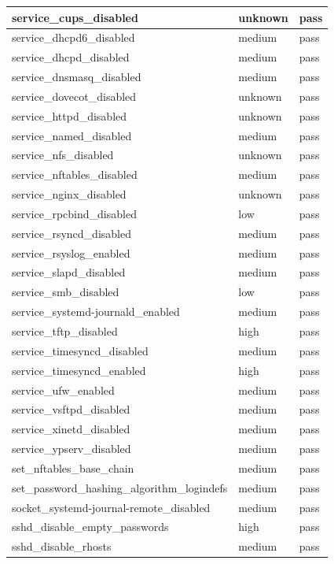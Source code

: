\begin{longtable}{|p{10cm}|p{2cm}|p{2cm}|}
\hline
service\_cups\_disabled & unknown & pass \\
\hline
service\_dhcpd6\_disabled & medium & pass \\
\hline
service\_dhcpd\_disabled & medium & pass \\
\hline
service\_dnsmasq\_disabled & medium & pass \\
\hline
service\_dovecot\_disabled & unknown & pass \\
\hline
service\_httpd\_disabled & unknown & pass \\
\hline
service\_named\_disabled & medium & pass \\
\hline
service\_nfs\_disabled & unknown & pass \\
\hline
service\_nftables\_disabled & medium & pass \\
\hline
service\_nginx\_disabled & unknown & pass \\
\hline
service\_rpcbind\_disabled & low & pass \\
\hline
service\_rsyncd\_disabled & medium & pass \\
\hline
service\_rsyslog\_enabled & medium & pass \\
\hline
service\_slapd\_disabled & medium & pass \\
\hline
service\_smb\_disabled & low & pass \\
\hline
service\_systemd-journald\_enabled & medium & pass \\
\hline
service\_tftp\_disabled & high & pass \\
\hline
service\_timesyncd\_disabled & medium & pass \\
\hline
service\_timesyncd\_enabled & high & pass \\
\hline
service\_ufw\_enabled & medium & pass \\
\hline
service\_vsftpd\_disabled & medium & pass \\
\hline
service\_xinetd\_disabled & medium & pass \\
\hline
service\_ypserv\_disabled & medium & pass \\
\hline
set\_nftables\_base\_chain & medium & pass \\
\hline
set\_password\_hashing\_algorithm\_logindefs & medium & pass \\
\hline
socket\_systemd-journal-remote\_disabled & medium & pass \\
\hline
sshd\_disable\_empty\_passwords & high & pass \\
\hline
sshd\_disable\_rhosts & medium & pass \\

\end{longtable}
